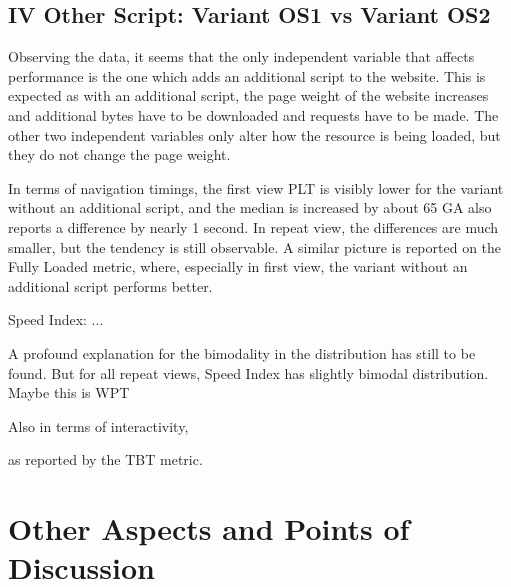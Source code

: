 
\subsection{IV Other Script: Variant OS1 vs Variant OS2}


Observing the data, it seems that the only independent variable that affects performance is the one which adds an additional script to the website.
This is expected as with an additional script, the page weight of the website increases and additional bytes have to be downloaded and requests have to be made.
The other two independent variables only alter how the resource is being loaded, but they do not change the page weight.


In terms of navigation timings, the first view PLT is visibly lower for the variant without an additional script, and the median is increased by about 65 %
GA also reports a difference by nearly 1 second.
In repeat view, the differences are much smaller, but the tendency is still observable.
A similar picture is reported on the Fully Loaded metric, where, especially in first view, the variant without an additional script performs better.

Speed Index: ...

A profound explanation for the bimodality in the distribution has still to be found.
But for all repeat views, Speed Index has slightly bimodal distribution.
Maybe this is WPT

Also in terms of interactivity,

as reported by the TBT metric.







\section{Other Aspects and Points of Discussion}



